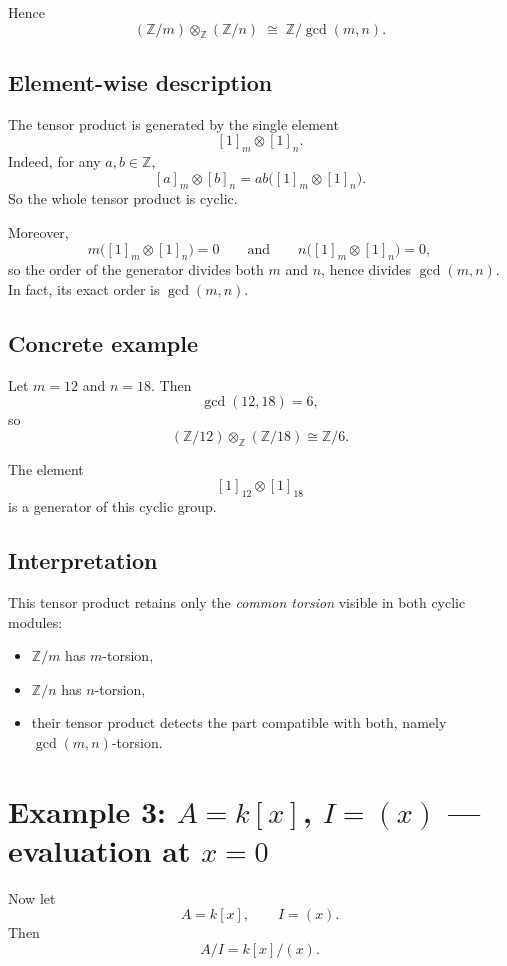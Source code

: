 \documentclass[12pt,a4paper]{article}
\theoremstyle{plain}
\theoremstyle{definition}      %
\begin{document}
	Hence
	\[
	(\mathbb Z/m)\otimes_{\mathbb Z}(\mathbb Z/n)
	\;\cong\;
	\mathbb Z/\gcd(m,n).
	\]
	
	\subsection{Element-wise description}
	
	The tensor product is generated by the single element
	\[
	[1]_m\otimes [1]_n.
	\]
	Indeed, for any \(a,b\in\mathbb Z\),
	\[
	[a]_m\otimes [b]_n
	=
	ab\bigl([1]_m\otimes[1]_n\bigr).
	\]
	So the whole tensor product is cyclic.
	
	Moreover,
	\[
	m\bigl([1]_m\otimes[1]_n\bigr)=0
	\qquad\text{and}\qquad
	n\bigl([1]_m\otimes[1]_n\bigr)=0,
	\]
	so the order of the generator divides both \(m\) and \(n\), hence divides \(\gcd(m,n)\). In fact, its exact order is \(\gcd(m,n)\).
	
	\subsection{Concrete example}
	
	Let \(m=12\) and \(n=18\). Then
	\[
	\gcd(12,18)=6,
	\]
	so
	\[
	(\mathbb Z/12)\otimes_{\mathbb Z}(\mathbb Z/18)\cong \mathbb Z/6.
	\]
	
	The element
	\[
	[1]_{12}\otimes [1]_{18}
	\]
	is a generator of this cyclic group.
	
	\subsection{Interpretation}
	
	This tensor product retains only the \emph{common torsion} visible in both cyclic modules:
	\begin{itemize}
		\item \(\mathbb Z/m\) has \(m\)-torsion,
		\item \(\mathbb Z/n\) has \(n\)-torsion,
		\item their tensor product detects the part compatible with both, namely \(\gcd(m,n)\)-torsion.
	\end{itemize}
	
	\section{Example 3: \texorpdfstring{$A=k[x]$, $I=(x)$}{A=k[x], I=(x)} --- evaluation at \texorpdfstring{$x=0$}{x=0}}
	
	Now let
	\[
	A=k[x], \qquad I=(x).
	\]
	Then
	\[
	A/I = k[x]/(x).
	\]
	
\end{document}
